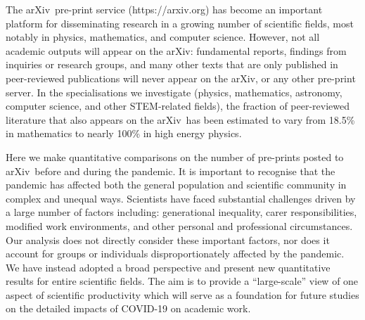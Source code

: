 \documentclass[]{rsos}%
\newcommand{\arxiv}{arXiv}
\newcommand{\change}[1]{#1}
\begin{document}
\maketitle



\change{The \arxiv\ pre-print service\cite{Ginsparg:2011} ({https://arxiv.org}) has become an important platform for disseminating research in a growing number of scientific fields, most notably in physics, mathematics, and computer science. However, not all academic outputs will appear on the \arxiv: fundamental reports, findings from inquiries or research groups, and many other texts that are only published in peer-reviewed publications will never appear on the \arxiv, or any other pre-print server. In the specialisations we investigate (physics, mathematics, astronomy, computer science, and other STEM-related fields), the fraction of peer-reviewed literature that also appears on the \arxiv\ has been estimated to vary from 18.5\% in mathematics to nearly 100\% in high energy physics\cite{Davis:2007,GentilBeccot:2009}.}


 Here we make quantitative comparisons on the number of pre-prints posted to \arxiv\ before and during the pandemic. It is important to recognise that the pandemic has affected both the general population\cite{Nicola:2020,Chu:2020,IbnMohammed:2021} and scientific community\cite{Viglione:2020,Gewen:2020,King:2021} in complex and unequal ways. Scientists have faced substantial challenges driven by a large number of factors including: generational inequality, carer responsibilities, modified work environments, and other personal and professional circumstances. Our analysis does not directly consider these important factors, nor does it account for groups or individuals disproportionately affected by the pandemic. We have instead adopted a broad perspective and present new quantitative results for entire scientific fields. The aim is to provide a “large-scale” view of \change{one aspect of} scientific productivity which will serve as a foundation for future studies on the detailed impacts of COVID-19 on academic work.
\end{document}
